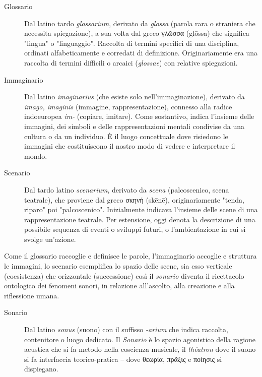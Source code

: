 \documentclass{../../lib/gs}
\begin{document}
\begin{description}
  \item[Glossario] Dal latino tardo \emph{glossarium}, derivato da \emph{glossa}
  (parola rara o straniera che necessita spiegazione), a sua volta dal greco
  \textgreek{γλῶσσα} (glōssa) che significa "lingua" o "linguaggio". Raccolta di
  termini specifici di una disciplina, ordinati alfabeticamente e corredati di
  definizione. Originariamente era una raccolta di termini difficili o arcaici
  (\emph{glossae}) con relative spiegazioni.
  \item[Immaginario] Dal latino \emph{imaginarius} (che esiste solo
  nell'immaginazione), derivato da \emph{imago, imaginis} (immagine,
  rappresentazione), connesso alla radice indoeuropea \emph{im-} (copiare,
  imitare). Come sostantivo, indica l'insieme delle immagini, dei simboli e
  delle rappresentazioni mentali condivise da una cultura o da un individuo. È
  il luogo concettuale dove risiedono le immagini che costituiscono il nostro
  modo di vedere e interpretare il mondo.
  \item[Scenario] Dal tardo latino \emph{scenarium}, derivato da \emph{scena}
  (palcoscenico, scena teatrale), che proviene dal greco \textgreek{σκηνή}
  (skēnē), originariamente "tenda, riparo" poi "palcoscenico". Inizialmente
  indicava l'insieme delle scene di una rappresentazione teatrale. Per
  estensione, oggi denota la descrizione di una possibile sequenza di eventi o
  sviluppi futuri, o l'ambientazione in cui si svolge un'azione.
\end{description}

Come il glossario raccoglie e definisce le parole, l'immaginario accoglie e
struttura le immagini, lo scenario esemplifica lo spazio delle scene, sia esso
verticale (coesistenza) che orizzontale (successione) così il \emph{sonario}
diventa il ricettacolo ontologico dei fenomeni sonori, in relazione all'ascolto,
alla creazione e alla riflessione umana.

\begin{description}
  \item[Sonario] Dal latino \emph{sonus} (suono) con il suffisso \emph{-arium}
  che indica raccolta, contenitore o luogo dedicato. Il \emph{Sonario} è lo
  spazio agonistico della ragione acustica che si fa metodo nella coscienza
  musicale, il \emph{théatron} dove il suono si fa interfaccia teorico-pratica –
  dove \textgreek{θεωρία}, \textgreek{πρᾶξις} e \textgreek{ποίησις} si dispiegano.
\end{description}
\end{document}
